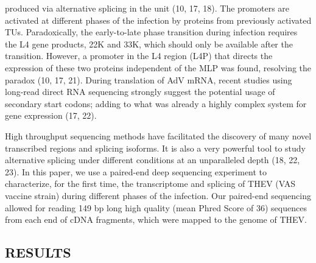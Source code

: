 \documentclass[
]{article}
\begin{document}
produced via alternative splicing in the unit (10, 17, 18). The
promoters are activated at different phases of the infection by proteins
from previously activated TUs. Paradoxically, the early-to-late phase
transition during infection requires the L4 gene products, 22K and 33K,
which should only be available after the transition. However, a promoter
in the L4 region (L4P) that directs the expression of these two proteins
independent of the MLP was found, resolving the paradox (10, 17, 21).
During translation of AdV mRNA, recent studies using long-read direct
RNA sequencing strongly suggest the potential usage of secondary start
codons; adding to what was already a highly complex system for gene
expression (17, 22).

High throughput sequencing methods have facilitated the discovery of
many novel transcribed regions and splicing isoforms. It is also a very
powerful tool to study alternative splicing under different conditions
at an unparalleled depth (18, 22, 23). In this paper, we use a
paired-end deep sequencing experiment to characterize, for the first
time, the transcriptome and splicing of THEV (VAS vaccine strain) during
different phases of the infection. Our paired-end sequencing allowed for
reading 149 bp long high quality (mean Phred Score of 36) sequences from
each end of cDNA fragments, which were mapped to the genome of THEV.
\newpage

\subsection{RESULTS}\label{results}
\end{document}
